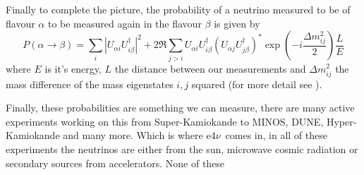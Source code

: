 \documentclass[a4paper,12pt]{article}
\newcommand{\efn}{e4$\nu$}
\begin{document}
Finally to complete the picture, the probability of a neutrino measured to be of flavour $\alpha$ to be measured again in the flavour $\beta$ is given by 
\begin{equation}
    P(\alpha \rightarrow \beta) = \sum_i |U_{\alpha i} U^\dag_{i \beta}|^2 + 2\Re \sum_{j>i} U_{\alpha i} U^\dag_{i \beta} (U_{\alpha j} U^\dag_{j \beta})^* \exp(-i\frac{\Delta m^2_{ij}}{2})\frac{L}{E}
\end{equation}
where $E$ is it's energy, $L$ the distance between our measurements and $\Delta m^2_{ij}$ the mass difference of the mass eigenstates $i, j$ squared (for more detail see \cite{zuberNeutrinoPhysics2020}).

Finally, these probabilities are something we can measure, there are many active experiments working on this  from Super-Kamiokande to MINOS, DUNE, Hyper-Kamiokande and many more.
Which is where \efn\ comes in, in all of these experiments the neutrinos are either from the sun, microwave cosmic radiation or secondary sources from accelerators\cite{zuberNeutrinoPhysics2020}.
None of these 

\end{document}
